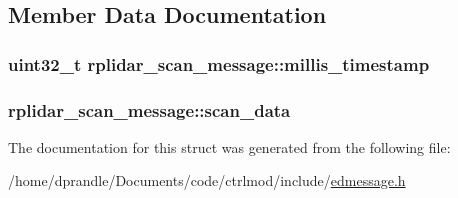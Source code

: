 \subsection{Member Data Documentation}
\hypertarget{structrplidar__scan__message_a8a3d08350e35f717ef463ee0ee6f6952}{
\subsubsection[{millis\-\_\-timestamp}]{\setlength{\rightskip}{0pt plus 5cm}uint32\-\_\-t rplidar\-\_\-scan\-\_\-message\-::millis\-\_\-timestamp}}\label{structrplidar__scan__message_a8a3d08350e35f717ef463ee0ee6f6952}
\hypertarget{structrplidar__scan__message_a93aed58534e2f3b8263c3a27e4b1f511}{
\subsubsection[{scan\-\_\-data}]{ rplidar\-\_\-scan\-\_\-message\-::scan\-\_\-data}}\label{structrplidar__scan__message_a93aed58534e2f3b8263c3a27e4b1f511}


The documentation for this struct was generated from the following file\-:\begin{DoxyCompactItemize}
\item 
/home/dprandle/\-Documents/code/ctrlmod/include/\hyperlink{edmessage_8h}{edmessage.\-h}\end{DoxyCompactItemize}
